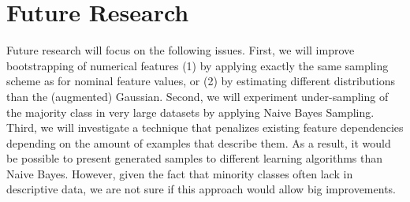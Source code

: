 \section{Future Research}\label{conclusion-recommendations}
Future research will focus on the following issues. First, we will improve bootstrapping of numerical features (1) by applying exactly the same sampling scheme as for nominal feature values, or (2) by estimating different distributions than the (augmented) Gaussian. Second, we will experiment under-sampling of the majority class in very large datasets by applying Naive Bayes Sampling. Third, we will investigate a technique that penalizes existing feature dependencies depending on the amount of examples that describe them. As a result, it would be possible to present generated samples to different learning algorithms than Naive Bayes. However, given the fact that minority classes often lack in descriptive data, we are not sure if this approach would allow big improvements.

